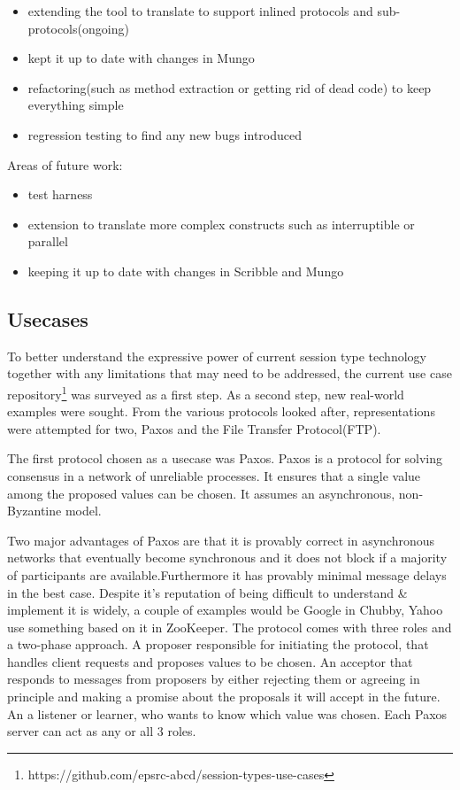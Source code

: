 \begin{itemize}
  \item extending the tool to translate to support inlined protocols and sub-protocols(ongoing)
  \item kept it up to date with changes in Mungo
  \item refactoring(such as method extraction or getting rid of dead code) to keep everything simple
  \item regression testing to find any new bugs introduced
\end{itemize}

Areas of future work:
\begin{itemize}
  \item test harness
  \item extension to translate more complex constructs such as interruptible or parallel
  \item keeping it up to date with changes in Scribble and Mungo
\end{itemize}


\subsection{Usecases}
\label{sub:usecases}

To better understand the expressive power of current session type technology together with any limitations that may need to be addressed, the current use case repository\footnote{https://github.com/epsrc-abcd/session-types-use-cases} was surveyed as a first step. As a second step, new real-world examples were sought. From the various protocols looked after, representations were attempted for two, Paxos and the File Transfer Protocol(FTP).

The first protocol chosen as a usecase was Paxos. Paxos is a protocol for solving consensus in a network of unreliable processes. It ensures that a single value among the proposed values can be chosen. It assumes an asynchronous, non-Byzantine model.\cite{paxos}

Two major advantages of Paxos are that it is provably correct in asynchronous networks that eventually become synchronous and it does not block if a majority of participants are available.Furthermore it has provably minimal message delays in the best case.
Despite it's reputation of being difficult to understand \& implement it is widely, a couple of examples would be Google in Chubby, Yahoo use something based on it in ZooKeeper.
The protocol comes with three roles and a two-phase approach. A proposer
responsible for initiating the protocol, that handles client requests and
proposes values to be chosen. An acceptor that responds to messages from proposers by either rejecting them or agreeing in principle and making a promise about the proposals it will accept in the future. An a listener or learner, who
wants to know which value was chosen. Each Paxos server can act as any or all 3 roles.

